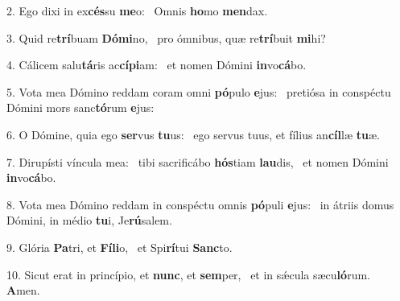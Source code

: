 2. Ego dixi in ex\textbf{cés}su \textbf{me}o: \ast\  Omnis \textbf{ho}mo \textbf{men}dax.\

3. Quid re\textbf{trí}buam \textbf{Dó}\textbf{mi}no, \ast\  pro ómnibus, quæ re\textbf{trí}buit \textbf{mi}hi?\

4. Cálicem salu\textbf{tá}ris ac\textbf{cí}\textbf{pi}am: \ast\  et nomen Dómini \textbf{in}vo\textbf{cá}bo.\

5. Vota mea Dómino reddam coram omni \textbf{pó}pulo \textbf{e}jus: \ast\  pretiósa in conspéctu Dómini mors sanc\textbf{tó}rum \textbf{e}jus:\

6. O Dómine, quia ego \textbf{ser}vus \textbf{tu}us: \ast\  ego servus tuus, et fílius an\textbf{cíl}læ \textbf{tu}æ.\

7. Dirupísti víncula mea: \dag\  tibi sacrificábo \textbf{hós}tiam \textbf{lau}dis, \ast\  et nomen Dómini \textbf{in}vo\textbf{cá}bo.\

8. Vota mea Dómino reddam in conspéctu omnis \textbf{pó}puli \textbf{e}jus: \ast\  in átriis domus Dómini, in médio \textbf{tu}i, Je\textbf{rú}salem.\

9. Glória \textbf{Pa}tri, et \textbf{Fí}\textbf{li}o, \ast\  et Spi\textbf{rí}tui \textbf{Sanc}to.\

10. Sicut erat in princípio, et \textbf{nunc}, et \textbf{sem}per, \ast\  et in sǽcula sæcu\textbf{ló}rum. \textbf{A}men.\

